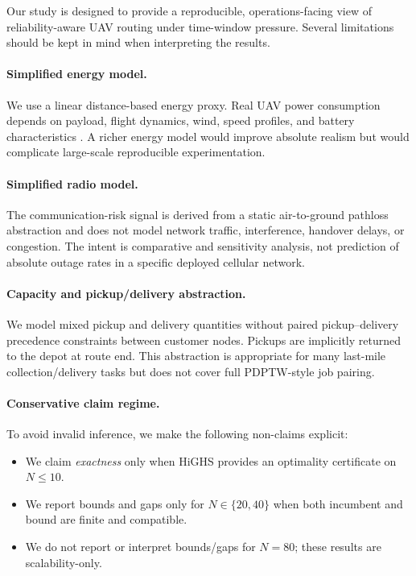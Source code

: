 \label{sec:limitations}

Our study is designed to provide a reproducible, operations-facing view of reliability-aware UAV routing under time-window pressure. Several limitations should be kept in mind when interpreting the results.

\paragraph{Simplified energy model.}
We use a linear distance-based energy proxy. Real UAV power consumption depends on payload, flight dynamics, wind, speed profiles, and battery characteristics \citep{dorling2017}. A richer energy model would improve absolute realism but would complicate large-scale reproducible experimentation.

\paragraph{Simplified radio model.}
The communication-risk signal is derived from a static air-to-ground pathloss abstraction and does not model network traffic, interference, handover delays, or congestion. The intent is comparative and sensitivity analysis, not prediction of absolute outage rates in a specific deployed cellular network.

\paragraph{Capacity and pickup/delivery abstraction.}
We model mixed pickup and delivery quantities without paired pickup--delivery precedence constraints between customer nodes. Pickups are implicitly returned to the depot at route end. This abstraction is appropriate for many last-mile collection/delivery tasks but does not cover full PDPTW-style job pairing.

\paragraph{Conservative claim regime.}
To avoid invalid inference, we make the following non-claims explicit:
\begin{itemize}[leftmargin=*]
\item We claim \emph{exactness} only when HiGHS provides an optimality certificate on $N\le 10$.
\item We report bounds and gaps only for $N\in\{20,40\}$ when both incumbent and bound are finite and compatible.
\item We do not report or interpret bounds/gaps for $N=80$; these results are scalability-only.
\end{itemize}


